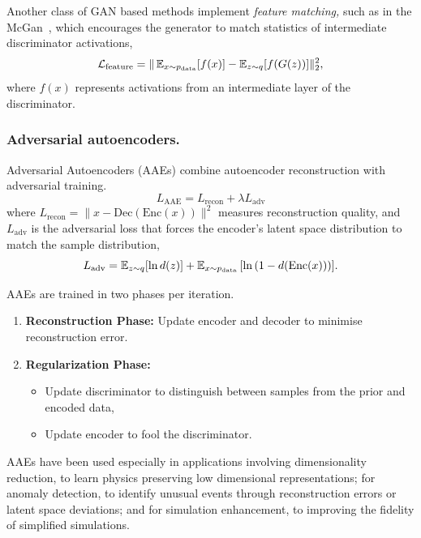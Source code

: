             Another class of GAN based methods implement \emph{feature matching,} such as in the McGan~\cite{mroueh_mcgan_2017}, which encourages the generator to match statistics of intermediate discriminator activations,
            \begin{equation}
                \mathcal{L}_{\text{feature}} = \|\operatorname{\mathbb{E}}_{x \sim p_{\text{data}}}[f(x)] - \operatorname{\mathbb{E}}_{z \sim q}[f(G(z))]\|_2^2,
            \end{equation}
            where \(f(x)\) represents activations from an intermediate layer of the discriminator.
        \subsubsection{Adversarial autoencoders.}
        Adversarial Autoencoders (AAEs) combine autoencoder reconstruction with adversarial training.
        \begin{equation}
            L_{\text{AAE}} = L_{\text{recon}} + \lambda L_{\text{adv}}
        \end{equation}
        where \(L_{\text{recon}} = \|x - \text{Dec}(\text{Enc}(x))\|^2\) measures reconstruction quality, and \(L_{\text{adv}}\) is the adversarial loss that forces the encoder's latent space distribution to match the sample distribution,
        \begin{equation}
            L_{\text{adv}} = \operatorname{\mathbb{E}}_{z \sim q}[\ln d(z)] + \operatorname{\mathbb{E}}_{x \sim p_{\text{data}}}\qty[\ln\qty(1 - d(\text{Enc}(x)))].
        \end{equation}

        AAEs are trained in two phases per iteration.
        \begin{enumerate}
            \item \textbf{Reconstruction Phase:} Update encoder and decoder to minimise reconstruction error.
            \item \textbf{Regularization Phase:}
            \begin{itemize}
                \item Update discriminator to distinguish between samples from the prior and encoded data,
                \item Update encoder to fool the discriminator.
            \end{itemize}
        \end{enumerate}
        AAEs have been used especially in applications involving dimensionality reduction, to learn physics preserving low dimensional representations;
        for anomaly detection, to identify unusual events through reconstruction errors or latent space deviations; and for simulation enhancement, to improving the fidelity of simplified simulations.
